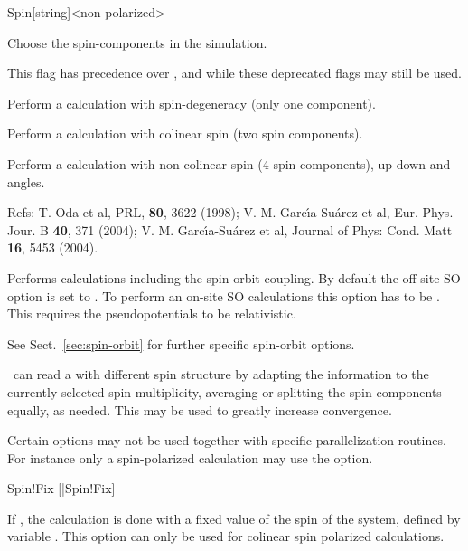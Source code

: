 \begin{fdfentry}{Spin}[string]<non-polarized>

  Choose the spin-components in the simulation.

  \note This flag has precedence over ,  and
   while these deprecated flags may still be used.
  \begin{fdfoptions}

    Perform a calculation with spin-degeneracy (only one component).

    \option[polarized]%
    Perform a calculation with colinear spin (two spin components).

    Perform a calculation with non-colinear spin (4 spin components),
    up-down and angles.

    Refs: T. Oda et al, PRL, \textbf{80}, 3622 (1998); 
    V. M. Garc\'{\i}a-Su\'arez et al, Eur. Phys. Jour. B \textbf{40}, 371 (2004);
    V. M. Garc\'{\i}a-Su\'arez et al, Journal of
    Phys: Cond. Matt \textbf{16}, 5453 (2004).

    Performs calculations including the spin-orbit coupling. By default the 
    off-site SO option is set to \fdftrue. To perform an on-site SO calculations 
    this option has to be . This requires the
    pseudopotentials to be relativistic.

    See Sect.~\ref{sec:spin-orbit} for further specific spin-orbit options.

  \end{fdfoptions}

  \siesta\ can read a  with different spin structure by
  adapting the information to the currently selected spin
  multiplicity, averaging or splitting the spin components equally, as
  needed. This may be used to greatly increase convergence.

  Certain options may not be used together with specific
  parallelization routines.  For instance only a spin-polarized
  calculation may use the  option.

\end{fdfentry}

\begin{fdflogicalF}{Spin!Fix}
  [|Spin!Fix]

  If \fdftrue, the calculation is done with a fixed value of the spin
  of the system, defined by variable . This option can
  only be used for colinear spin polarized calculations.

\end{fdflogicalF}

